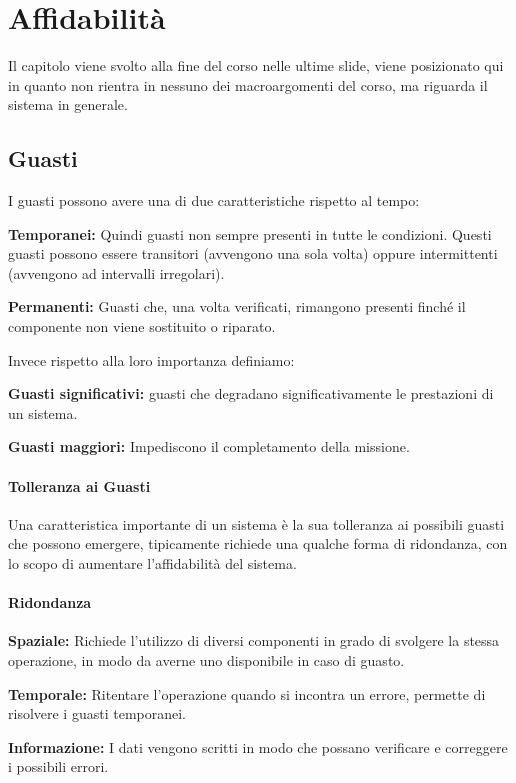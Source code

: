 \chapter{Affidabilità}

Il capitolo viene svolto alla fine del corso nelle ultime slide, viene posizionato qui in quanto non rientra in nessuno dei macroargomenti del corso, ma riguarda il sistema in generale.

\section{Guasti}
I guasti possono avere una di due caratteristiche rispetto al tempo:
\begin{sitemize}
    \item \textbf{Temporanei:} Quindi guasti non sempre presenti in tutte le condizioni. Questi guasti possono essere transitori (avvengono una sola volta) oppure intermittenti (avvengono ad intervalli irregolari).

    \item \textbf{Permanenti:} Guasti che, una volta verificati, rimangono presenti finché il componente non viene sostituito o riparato.
\end{sitemize}

Invece rispetto alla loro importanza definiamo:
\begin{sitemize}
    \item \textbf{Guasti significativi:} guasti che degradano significativamente le prestazioni di un sistema.
    \item \textbf{Guasti maggiori:} Impediscono il completamento della missione.
\end{sitemize}

\subsubsection*{Tolleranza ai Guasti}
Una caratteristica importante di un sistema è la sua tolleranza ai possibili guasti che possono emergere, tipicamente richiede una qualche forma di ridondanza, con lo scopo di aumentare l'affidabilità del sistema.

\subsubsection*{Ridondanza}
\begin{sitemize}
    \item \textbf{Spaziale:} Richiede l'utilizzo di diversi componenti in grado di svolgere la stessa operazione, in modo da averne uno disponibile in caso di guasto.
    \item \textbf{Temporale:} Ritentare l'operazione quando si incontra un errore, permette di risolvere i guasti temporanei.
    \item \textbf{Informazione:} I dati vengono scritti in modo che possano verificare e correggere i possibili errori.
\end{sitemize}

